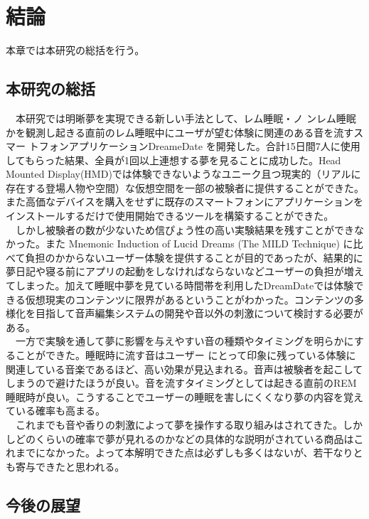 \chapter{結論}
\label{chap:coding}

本章では本研究の総括を行う。
\section{本研究の総括}
　本研究では明晰夢を実現できる新しい手法として、レム睡眠・ノ ンレム睡眠かを観測し起きる直前のレム睡眠中にユーザが望む体験に関連のある音を流すスマー トフォンアプリケーションDreameDate を開発した。合計15日間7人に使用してもらった結果、全員が1回以上連想する夢を見ることに成功した。Head Mounted Display(HMD)では体験できないようなユニーク且つ現実的（リアルに存在する登場人物や空間）な仮想空間を一部の被験者に提供することができた。また高価なデバイスを購入をせずに既存のスマートフォンにアプリケーションをインストールするだけで使用開始できるツールを構築することができた。\\
　しかし被験者の数が少ないため信ぴょう性の高い実験結果を残すことができなかった。また Mnemonic Induction of Lucid Dreams (The MILD Technique)\cite{LaBerge} に比べて負担のかからないユーザー体験を提供することが目的であったが、結果的に夢日記や寝る前にアプリの起動をしなければならないなどユーザーの負担が増えてしまった。加えて睡眠中夢を見ている時間帯を利用したDreamDateでは体験できる仮想現実のコンテンツに限界があるということがわかった。コンテンツの多様化を目指して音声編集システムの開発や音以外の刺激について検討する必要がある。\\
　一方で実験を通して夢に影響を与えやすい音の種類やタイミングを明らかにすることができた。睡眠時に流す音はユーザー にとって印象に残っている体験に関連している音楽であるほど、高い効果が見込まれる。音声は被験者を起こしてしまうので避けたほうが良い。音を流すタイミングとしては起きる直前のREM睡眠時が良い。こうすることでユーザーの睡眠を害しにくくなり夢の内容を覚えている確率も高まる。\\
　これまでも音や香りの刺激によって夢を操作する取り組みはされてきた。しかしどのくらいの確率で夢が見れるのかなどの具体的な説明がされている商品はこれまでになかった。よって本解明できた点は必ずしも多くはないが、若干なりとも寄与できたと思われる。

\section{今後の展望}

